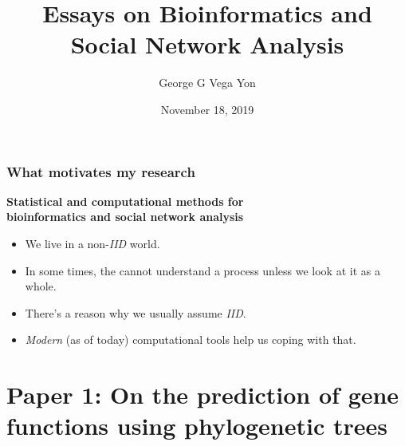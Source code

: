 \documentclass[aspectratio=169, 9pt]{beamer}\usepackage[]{graphicx}\usepackage[]{color}
\title[Stat. Comp. for Complex Systems]{Essays on Bioinformatics and
Social Network Analysis
\linebreak{\small Statistical and Computational Methods for
Complex Systems}}
\author[GGVY]{George G Vega Yon}
\institute[USC-PREVMED]{University of Southern California, Department of Preventive Medicine}
\date{November 18, 2019}
\begin{document}

\begin{frame}%
\maketitle
\end{frame}

\begin{frame}
\frametitle{What motivates my research}

\begin{center}
\large
\textcolor{usccardinal}{\bf Statistical and computational methods for\\ %
bioinformatics and social network analysis}
\end{center}

\begin{itemize}[<+->]
\item We live in a non-{\it IID} world.
\item In some times, the cannot understand a process unless we look at it as a whole.
\item There's a reason why we usually assume {\it IID}.
\item {\it Modern} (as of today) computational tools help us coping with that.
\end{itemize}
\end{frame}



\section{Paper 1: On the prediction of gene functions using phylogenetic trees}

\end{document}
